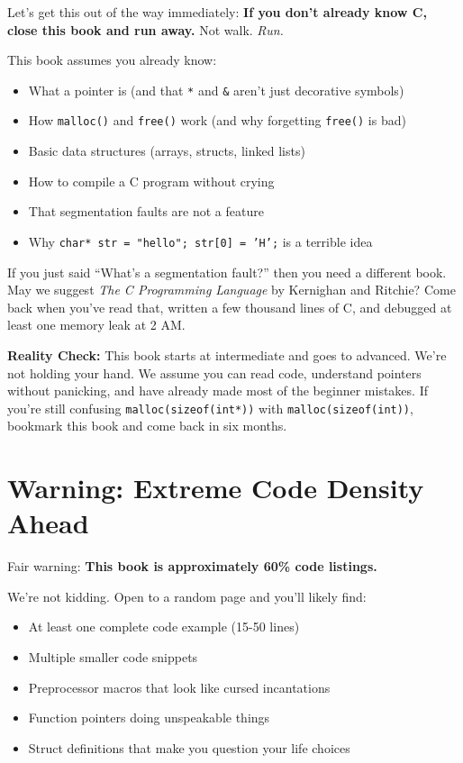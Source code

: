 \documentclass[10pt,openany]{book}
\begin{document}
Let's get this out of the way immediately: \textbf{If you don't already know C, close this book and run away.} Not walk. \textit{Run.}

This book assumes you already know:
\begin{itemize}
    \item What a pointer is (and that \texttt{*} and \texttt{\&} aren't just decorative symbols)
    \item How \texttt{malloc()} and \texttt{free()} work (and why forgetting \texttt{free()} is bad)
    \item Basic data structures (arrays, structs, linked lists)
    \item How to compile a C program without crying
    \item That segmentation faults are not a feature
    \item Why \texttt{char* str = "hello"; str[0] = 'H';} is a terrible idea
\end{itemize}

If you just said ``What's a segmentation fault?'' then you need a different book. May we suggest \textit{The C Programming Language} by Kernighan and Ritchie? Come back when you've read that, written a few thousand lines of C, and debugged at least one memory leak at 2 AM.

\begin{warningbox}
\textbf{Reality Check:} This book starts at intermediate and goes to advanced. We're not holding your hand. We assume you can read code, understand pointers without panicking, and have already made most of the beginner mistakes. If you're still confusing \texttt{malloc(sizeof(int*))} with \texttt{malloc(sizeof(int))}, bookmark this book and come back in six months.
\end{warningbox}

\section*{Warning: Extreme Code Density Ahead}

Fair warning: \textbf{This book is approximately 60\% code listings.}

We're not kidding. Open to a random page and you'll likely find:
\begin{itemize}
    \item At least one complete code example (15-50 lines)
    \item Multiple smaller code snippets
    \item Preprocessor macros that look like cursed incantations
    \item Function pointers doing unspeakable things
    \item Struct definitions that make you question your life choices
\end{itemize}
\end{document}
